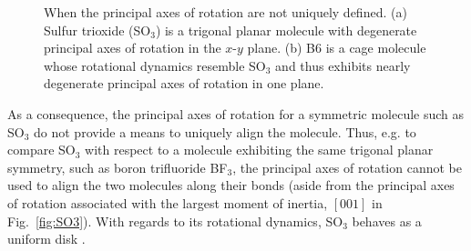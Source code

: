 \documentclass[journal=jacsat,manuscript=article]{achemso}
\begin{document}
{\begin{figure}
\centering
	\caption{{\color{red} When the principal axes of rotation are not uniquely defined. (a) Sulfur trioxide (SO$_3$) is a trigonal planar molecule with degenerate principal axes of rotation in the $x$-$y$ plane. (b) B6 is a cage molecule whose rotational dynamics resemble SO$_3$ and thus exhibits nearly degenerate principal axes of rotation in one plane.
	}%
	} \label{fig:irrationallyaligned}
\end{figure}

As a consequence, the principal axes of rotation for a symmetric molecule such as SO$_3$ do not provide a means to uniquely align the molecule. Thus, e.g. to compare SO$_3$ with respect to a molecule exhibiting the same trigonal planar symmetry, such as boron trifluoride BF$_3$, the principal axes of rotation cannot be used to align the two molecules along their bonds (aside from the principal axes of rotation associated with the largest moment of inertia, $[0 0 1]$ in Fig.~\ref{fig:SO3}). With regards to its rotational dynamics, SO$_3$ behaves as a uniform disk \cite{peraire2008lecture}.

}
\end{document}
